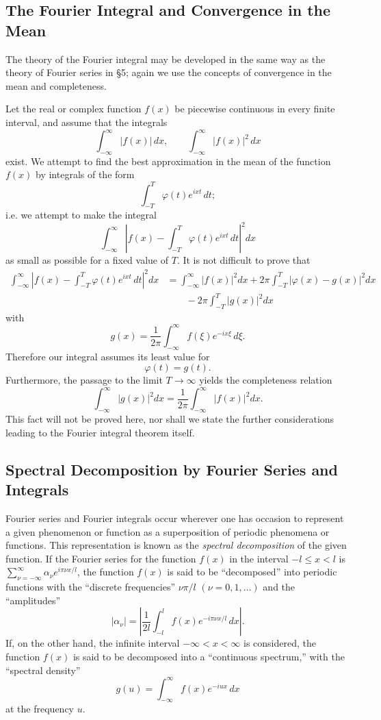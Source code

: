 \subsection{The Fourier Integral and Convergence in the Mean}
The theory of the Fourier integral may be developed in the same way as the theory of Fourier series in \S5; again we use the concepts of convergence in the mean and completeness.

Let the real or complex function $f(x)$ be piecewise continuous in every finite interval, and assume that the integrals
\[
\int_{-\infty}^{\infty}|f(x)|\,dx,
\qquad
\int_{-\infty}^{\infty}|f(x)|^2\,dx
\]
exist. We attempt to find the best approximation in the mean of the function $f(x)$ by integrals of the form
\[
\int_{-T}^{T}\varphi(t)e^{ixt}\,dt;
\]
i.e. we attempt to make the integral
\[
\int_{-\infty}^{\infty}\left|f(x)-\int_{-T}^{T}\varphi(t)e^{ixt}\,dt\right|^2dx
\]
as small as possible for a fixed value of $T$. It is not difficult to prove that
\[
\begin{aligned}
\int_{-\infty}^{\infty}\left|f(x)-\int_{-T}^{T}\varphi(t)e^{ixt}\,dt\right|^2dx
&=\int_{-\infty}^{\infty}|f(x)|^2dx
+2\pi\int_{-T}^{T}|\varphi(x)-g(x)|^2dx\\
&\qquad-2\pi\int_{-T}^{T}|g(x)|^2dx
\end{aligned}
\]
with
\[
g(x)=\frac{1}{2\pi}\int_{-\infty}^{\infty}f(\xi)e^{-ix\xi}\,d\xi.
\]
Therefore our integral assumes its least value for
\[
\varphi(t)=g(t).
\]
Furthermore, the passage to the limit $T\to\infty$ yields the completeness relation
\[
\int_{-\infty}^{\infty}|g(x)|^2dx
=\frac{1}{2\pi}\int_{-\infty}^{\infty}|f(x)|^2dx.
\]
This fact will not be proved here, nor shall we state the further considerations leading to the Fourier integral theorem itself.

\subsection{Spectral Decomposition by Fourier Series and Integrals}
Fourier series and Fourier integrals occur wherever one has occasion to represent a given phenomenon or function as a superposition of periodic phenomena or functions. This representation is known as the \emph{spectral decomposition} of the given function. If the Fourier series for the function $f(x)$ in the interval $-l\le x<l$ is $\sum_{\nu=-\infty}^{\infty}\alpha_\nu e^{i\pi\nu x/l}$, the function $f(x)$ is said to be ``decomposed'' into periodic functions with the ``discrete frequencies'' $\nu\pi/l$ $(\nu=0,1,\ldots)$ and the ``amplitudes''
\[
|\alpha_\nu|
=\left|\frac{1}{2l}\int_{-l}^{l}f(x)e^{-i\pi\nu x/l}\,dx\right|.
\]
If, on the other hand, the infinite interval $-\infty<x<\infty$ is considered, the function $f(x)$ is said to be decomposed into a ``continuous spectrum,'' with the ``spectral density''
\[
g(u)=\int_{-\infty}^{\infty}f(x)e^{-iux}\,dx
\]
at the frequency $u$.

